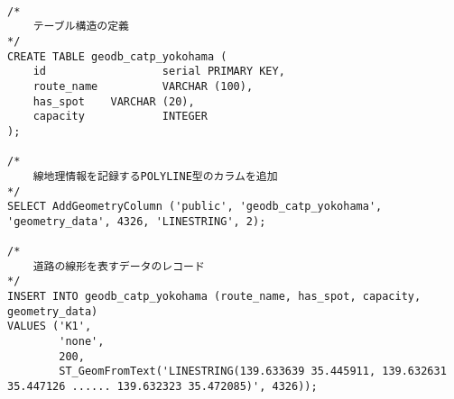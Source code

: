 \begin{lstlisting}[caption = 路線データを表すクエリーの例, label = program1]

/*
    テーブル構造の定義
*/
CREATE TABLE geodb_catp_yokohama (
    id                  serial PRIMARY KEY,
    route_name          VARCHAR (100),
    has_spot    VARCHAR (20),
    capacity            INTEGER
);

/*
    線地理情報を記録するPOLYLINE型のカラムを追加
*/
SELECT AddGeometryColumn ('public', 'geodb_catp_yokohama', 'geometry_data', 4326, 'LINESTRING', 2);

/*
    道路の線形を表すデータのレコード
*/
INSERT INTO geodb_catp_yokohama (route_name, has_spot, capacity, geometry_data)
VALUES ('K1',
        'none',
        200,
        ST_GeomFromText('LINESTRING(139.633639 35.445911, 139.632631 35.447126 ...... 139.632323 35.472085)', 4326));
\end{lstlisting}

    
    
    


